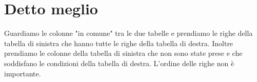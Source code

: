 \documentclass[12pt]{article}
\begin{document}
\section*{Detto meglio}
Guardiamo le colonne "in comune" tra le due tabelle e prendiamo le righe della tabella di sinistra che hanno tutte le righe della tabella di destra. Inoltre prendiamo le colonne della tabella di sinistra che non sono state prese e che soddisfano le condizioni della tabella di destra. L'ordine delle righe non è importante.
\end{document}
